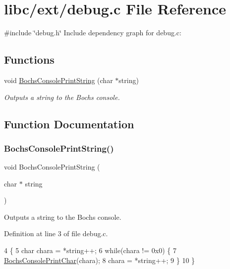 \hypertarget{a00029}{}\section{libc/ext/debug.c File Reference}
\label{a00029}
{\ttfamily \#include \char`\"{}debug.\+h\char`\"{}}\newline
Include dependency graph for debug.\+c\+:
\subsection*{Functions}
\begin{DoxyCompactItemize}
\item 
void \hyperlink{a00029_a19e1f554d03c977f8b947f21489daa41_a19e1f554d03c977f8b947f21489daa41}{Bochs\+Console\+Print\+String} (char $\ast$string)
\begin{DoxyCompactList}\small\item\em Outputs a string to the Bochs console. \end{DoxyCompactList}\end{DoxyCompactItemize}


\subsection{Function Documentation}
\mbox{\label{a00029_a19e1f554d03c977f8b947f21489daa41_a19e1f554d03c977f8b947f21489daa41}} 
\subsubsection{\texorpdfstring{Bochs\+Console\+Print\+String()}{BochsConsolePrintString()}}
{\footnotesize\ttfamily void Bochs\+Console\+Print\+String (\begin{DoxyParamCaption}\item[{char $\ast$}]{string }\end{DoxyParamCaption})}



Outputs a string to the Bochs console. 



Definition at line 3 of file debug.\+c.


\begin{DoxyCode}
4 \{
5     \textcolor{keywordtype}{char} chara = *\textcolor{keywordtype}{string}++;
6     \textcolor{keywordflow}{while}(chara != 0x0) \{
7         \hyperlink{a00032_aa2123d399356fa4ded8a39fdc167f31a_aa2123d399356fa4ded8a39fdc167f31a}{BochsConsolePrintChar}(chara);
8         chara = *\textcolor{keywordtype}{string}++;
9     \}
10 \}
\end{DoxyCode}
